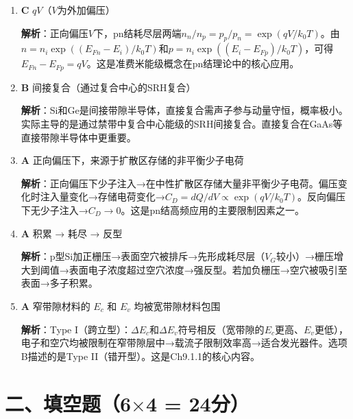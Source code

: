 \documentclass[12pt,a4paper]{ctexart}
\begin{document}
\begin{enumerate}[label=\arabic*.,nosep,leftmargin=2em]
\item \textbf{C} $qV$（$V$为外加偏压）

\textbf{解析}：正向偏压$V$下，pn结耗尽层两端$n_n/n_p = p_p/p_n = \exp(qV/k_0T)$。由$n = n_i\exp((E_{Fn}-E_i)/k_0T)$和$p = n_i\exp((E_i-E_{Fp})/k_0T)$，可得$E_{Fn} - E_{Fp} = qV$。这是准费米能级概念在pn结理论中的核心应用。

\item \textbf{B} 间接复合（通过复合中心的SRH复合）

\textbf{解析}：Si和Ge是间接带隙半导体，直接复合需声子参与动量守恒，概率极小。实际主导的是通过禁带中复合中心能级的SRH间接复合。直接复合在GaAs等直接带隙半导体中更重要。

\item \textbf{A} 正向偏压下，来源于扩散区存储的非平衡少子电荷

\textbf{解析}：正向偏压下少子注入→在中性扩散区存储大量非平衡少子电荷。偏压变化时注入量变化→存储电荷变化→$C_D = dQ/dV \propto \exp(qV/k_0T)$。反向偏压下无少子注入→$C_D \to 0$。这是pn结高频应用的主要限制因素之一。

\item \textbf{A} 积累 → 耗尽 → 反型

\textbf{解析}：p型Si加正栅压→表面空穴被排斥→先形成耗尽层（$V_G$较小）→栅压增大到阈值→表面电子浓度超过空穴浓度→强反型。若加负栅压→空穴被吸引至表面→多子积累。

\item \textbf{A} 窄带隙材料的 $E_c$ 和 $E_v$ 均被宽带隙材料包围

\textbf{解析}：Type I（跨立型）：$\Delta E_c$和$\Delta E_v$符号相反（宽带隙的$E_c$更高、$E_v$更低），电子和空穴均被限制在窄带隙层中→载流子限制效率高→适合发光器件。选项B描述的是Type II（错开型）。这是Ch9.1.1的核心内容。

\end{enumerate}

\newpage

\section*{二、填空题（6$\times$4 = 24分）}
\end{document}
